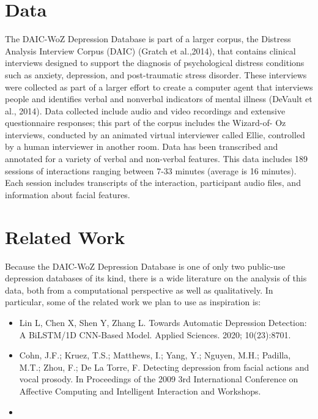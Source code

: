\section{Data}

The DAIC-WoZ Depression Database is part of a larger corpus, the Distress Analysis Interview Corpus (DAIC) (Gratch et al.,2014), that contains clinical interviews designed to support the diagnosis of psychological distress conditions such as anxiety, depression, and post-traumatic stress disorder. These interviews were collected as part of a larger effort to create a computer agent that interviews people and identifies verbal and nonverbal indicators of mental illness (DeVault et al., 2014). Data collected include audio and video recordings and extensive questionnaire responses; this part of the corpus includes the Wizard-of- Oz interviews, conducted by an animated virtual interviewer called Ellie, controlled by a human interviewer in another room. Data has been transcribed and annotated for a variety of verbal and non-verbal features. This data includes 189 sessions of interactions ranging between 7-33 minutes (average is 16 minutes). Each session includes transcripts of the interaction, participant audio files, and information about facial features.



\section{Related Work}

Because the DAIC-WoZ Depression Database is one of only two public-use depression databases of its kind, there is a wide literature on the analysis of this data, both from a computational perspective as well as qualitatively. In particular, some of the related work we plan to use as inspiration is:

\begin{itemize}
    \item Lin L, Chen X, Shen Y, Zhang L. Towards Automatic Depression Detection: A BiLSTM/1D CNN-Based Model. Applied Sciences. 2020; 10(23):8701. 
    \item Cohn, J.F.; Kruez, T.S.; Matthews, I.; Yang, Y.; Nguyen, M.H.; Padilla, M.T.; Zhou, F.; De La Torre, F. Detecting depression from facial actions and vocal prosody. In Proceedings of the 2009 3rd International Conference on Affective Computing and Intelligent Interaction and Workshops.
    \item 
\end{itemize}

